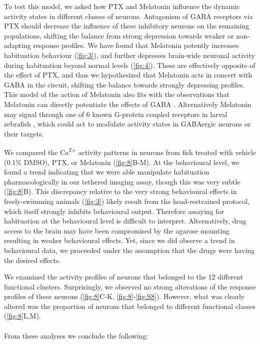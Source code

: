 \documentclass[9pt,lineno]{RandlettLab_elife}
\begin{document}
To test this model, we asked how PTX and Melatonin influence the dynamic activity states in different classes of neurons. Antagonism of GABA receptors via PTX should decrease the influence of these inhibitory neurons on the remaining populations, shifting the balance from strong depression towards weaker or non-adapting response profiles. We have found that Melatonin potently increases habituation behaviour (\autoref{fig:3}), and further depresses brain-wide neuronal activity during habituation beyond normal levels (\autoref{fig:4}). These are effectively opposite of the effect of PTX, and thus we hypothesized that Melatonin acts in concert with GABA in the circuit, shifting the balance towards strongly depressing profiles. This model of the action of Melatonin also fits with the observations that Melatonin can directly potentiate the effects of GABA \cite{Cheng2012-gv, Niles1987-oc}. Alternatively Melatonin may signal through one of 6 known G-protein coupled receptors in larval zebrafish \cite{Maugars2020-pz}, which could act to modulate activity states in GABAergic neurons or their targets. 

We compared the Ca\textsuperscript{2+} activity patterns in neurons from fish treated with vehicle (0.1\% DMSO), PTX, or Melatonin (\autoref{fig:8}B-M). At the behavioural level, we found a trend indicating that we were able manipulate habituation pharmacologically in our tethered imaging assay, though this was very subtle (\autoref{fig:8}B). This discrepancy relative to the very strong behavioural effects in freely-swimming animals (\autoref{fig:3}) likely result from the head-restrained protocol, which itself strongly inhibits behavioural output. Therefore assaying for habituation at the behavioural level is difficult to interpret. Alternatively, drug access to the brain may have been compromised by the agarose mounting resulting in weaker behavioural effects. Yet, since we did observe a trend in behavioural data, we proceeded under the assumption that the drugs were having the desired effects. 

We examined the activity profiles of neurons that belonged to the 12 different functional clusters. Surprisingly, we observed no strong alterations of the response profiles of these neurons (\autoref{fig:8}C-K, \autoref{fig:8}-\autoref{fig:S8}). However, what was clearly altered was the proportion of neurons that belonged to different functional classes (\autoref{fig:8}L,M).
\\
\\From these analyses we conclude the following:
\end{document}
